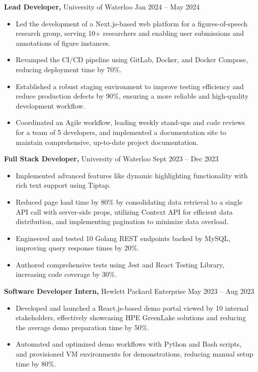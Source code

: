 \textbf{Lead Developer,} {University of Waterloo}  \hfill Jan 2024 -- May 2024 \\
\vspace{-9pt}
\begin{itemize}
  \item Led the development of a Next.js-based web platform for a figures-of-speech research group, serving 10+ researchers and enabling user submissions and annotations of figure instances.
  \item Revamped the CI/CD pipeline using GitLab, Docker, and Docker Compose, reducing deployment time by 70\%.
  \item Established a robust staging environment to improve testing efficiency and reduce production defects by 90\%, ensuring a more reliable and high-quality development workflow.
  \item Coordinated an Agile workflow, leading weekly stand-ups and code reviews for a team of 5 developers, and implemented a documentation site to maintain comprehensive, up-to-date project documentation.
\end{itemize}

\textbf{Full Stack Developer,} {University of Waterloo}  \hfill Sept 2023 -- Dec 2023 \\
\vspace{-9pt}
\begin{itemize}
  \item Implemented advanced features like dynamic highlighting functionality with rich text support using Tiptap.
  \item Reduced page load time by 80\% by consolidating data retrieval to a single API call with server-side props, utilizing Context API for efficient data distribution, and implementing pagination to minimize data overload.
  \item Engineered and tested 10 Golang REST endpoints backed by MySQL, improving query response times by 20\%.
  \item Authored comprehensive tests using Jest and React Testing Library, increasing code coverage by 30\%.
\end{itemize}

\textbf{Software Developer Intern,} {Hewlett Packard Enterprise}  \hfill May 2023 -- Aug 2023 \\
\vspace{-9pt}
\begin{itemize}
  \item Developed and launched a React.js-based demo portal viewed by 10 internal stakeholders, effectively showcasing HPE GreenLake solutions and reducing the average demo preparation time by 50\%.
  \item Automated and optimized demo workflows with Python and Bash scripts, and provisioned VM environments for demonstrations, reducing manual setup time by 80\%.
\end{itemize}

